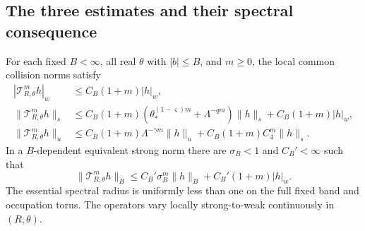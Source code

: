 \subsection{The three estimates and their spectral consequence}
\begin{theorem}
\label{thm:v40-polynomial-LY}
For each fixed $B<\infty$, all real $\theta$ with $|b|\le B$, and
$m\ge0$, the local common collision norms satisfy
\begin{align}
 |\mathscr T_{R,\theta}^m h|_w
     &\le C_B(1+m)|h|_w,                        \label{eq:v40-full-LY-w}\\
 \|\mathscr T_{R,\theta}^m h\|_s
     &\le C_B(1+m)(\theta_*^{(1-\varsigma)m}+\Lambda^{-qm})\|h\|_s
                +C_B(1+m)|h|_w,               \label{eq:v40-full-LY-s}\\
 \|\mathscr T_{R,\theta}^m h\|_u
     &\le C_B(1+m)\Lambda^{-\gamma m}\|h\|_u
                +C_B(1+m)C_4^m\|h\|_s.        \label{eq:v40-full-LY-u}
\end{align}
In a $B$-dependent equivalent strong norm there are $\sigma_B<1$ and
$C_B'<\infty$ such that
\begin{equation}\label{eq:v40-full-DF}
 \|\mathscr T_{R,\theta}^m h\|_B
       \le C_B'\sigma_B^m\|h\|_B+C_B'(1+m)|h|_w.
\end{equation}
The essential spectral radius is uniformly less than one on the full
fixed band and occupation torus. The operators vary locally
strong-to-weak continuously in $(R,\theta)$.
\end{theorem}
